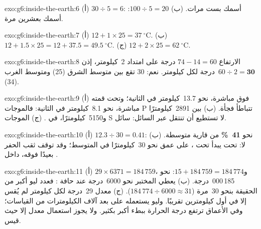 \begin{solution}{exo:g6:inside-the-earth:6}
(أ) $30 \div 5 = 6$: أسمك بست مرات. (ب) $100 \div 5 = 20$: أسمك بعشرين
مرة.
\end{solution}

\begin{solution}{exo:g6:inside-the-earth:7}
(أ) $12 + 1 \times 25 = 37~^\circ$C. (ب) $12 + 1.5 \times 25 = 12 + 37.5 =
49.5~^\circ$C. (ج) $12 + 2 \times 25 = 62~^\circ$C.
\end{solution}

\begin{solution}{exo:g6:inside-the-earth:8}
الارتفاع $74 - 14 = 60$ درجة على امتداد 2~كيلومتر، إذن $60 \div 2 =
\textbf{30}$~درجة لكل كيلومتر. نعم: 30 تقع بين متوسط الشرق
(25) ومتوسط الغرب (34).
\end{solution}

\begin{solution}{exo:g6:inside-the-earth:9}
(أ) فوق  مباشرة، نحو 13.7~كيلومتر في الثانية؛ وتحت قمته مباشرة،
نحو 8.1~كيلومتر في الثانية: فالموجات P تتباطأ فجأة. (ب) بين
2891~كيلومترًا و5150~كيلومترًا، في . (ج) الموجات S لا تستطيع أن تنتقل عبر
السائل:  سائل.
\end{solution}

\begin{solution}{exo:g6:inside-the-earth:10}
(أ) $12.3 \div 30 = 0.41$: نحو \textbf{41~\%} من  قارية
متوسطة. (ب) لا: تحت  يبدأ  تحت ، على عمق نحو
30~كيلومترًا في المتوسط؛ وقد توقف ثقب الحفر بعيدًا فوقه، داخل .
\end{solution}

\begin{solution}{exo:g6:inside-the-earth:11}
(أ) $29 \times 6371 = 184\,759$، و$15 + 184\,759 = 184\,774$: نحو
185\,000~درجة. (ب) يعطي المختبر نحو 6000~درجة عند حافة
: فعدد ليو أكبر من الحقيقة بنحو 30~مرة
($184\,774 \div 6000 \approx 31$). (ج) معدل 29~درجة لكل كيلومتر
لم يُقس إلا في أول كيلومترين تقريبًا. وليو يستعمله على بعد آلاف
الكيلومترات من القياسات؛ وفي الأعماق ترتفع درجة الحرارة ببطء
أكبر بكثير. ولا يجوز استعمال معدل إلا حيث قيس.
\end{solution}

